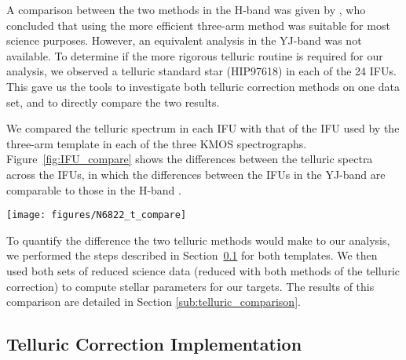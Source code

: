 \documentclass[manuscript]{aastex}
\begin{document}
A comparison between the two methods in the H-band was given by
\cite{2013A&A...558A..56D},
who concluded that using the more efficient three-arm method was suitable for most science purposes.
However, an equivalent analysis in the YJ-band was not available.
To determine if the more rigorous telluric routine is required for our analysis,
we observed a telluric standard star (HIP97618) in each of the 24 IFUs.
This gave us the tools to investigate both telluric correction methods on one data set,
and to directly compare the two results.

We compared the telluric spectrum in each IFU with that of the IFU used by the three-arm template in each of the three KMOS spectrographs.
Figure~\ref{fig:IFU_compare} shows the differences between the telluric spectra across the IFUs,
in which the differences between the IFUs in the YJ-band are comparable to those in the H-band
\cite[cf. Fig.7 from][]{2013A&A...558A..56D}.


\begin{figure*}
 \texttt{[image: figures/N6822\_t\_compare]}
 \caption{
    Comparison of J-band spectra of the same standard star in each IFU.
    The ratio of each spectrum compared to that from the IFU used in the three-arm telluric method is shown,
    with their respective mean and standard deviation ($\mu$ and $\sigma$).
    Red lines indicate $\mu$ = 1.0, $\sigma$ = 0.0 for each ratio.
    IFUs 13 and 16 are omitted as no data was taken with these IFUs.
          }
 \label{fig:IFU_compare}
\end{figure*}

To quantify the difference the two telluric methods would make to our analysis,
we performed the steps described in
Section~\ref{sub:ngc6822_telluric_correction} for both templates.
We then used both sets of reduced science data
(reduced with both methods of the telluric correction) to compute stellar parameters for our targets.
The results of this comparison are detailed in Section
\ref{sub:telluric_comparison}.


\subsection{Telluric Correction Implementation} %
\label{sub:ngc6822_telluric_correction}
\end{document}
